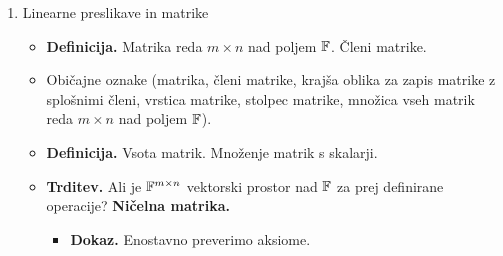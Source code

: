\begin{enumerate}
    \item Linearne preslikave in matrike
    \begin{itemize}
        \item \colorbox{purple!30}{\textbf{Definicija.}} Matrika reda $m \times n$ nad poljem $\mathbb{F}$. Členi matrike. 
        \item Običajne oznake (matrika, členi matrike, krajša oblika za zapis matrike z splošnimi členi, vrstica matrike, stolpec matrike, množica vseh matrik reda $m \times n$ nad poljem $\mathbb{F}$).
        \item \colorbox{purple!30}{\textbf{Definicija.}} Vsota matrik. Množenje matrik s skalarji.
        \item \colorbox{blue!30}{\textbf{Trditev.}} Ali je $\mathbb{F}^{m \times n}$ vektorski prostor nad $\mathbb{F}$ za prej definirane operacije? \textbf{Ničelna matrika.}
        \begin{itemize}
            \item \colorbox{green!30}{\textbf{Dokaz.}} Enostavno preverimo aksiome.
        \end{itemize}
    \end{itemize}


\end{enumerate}
